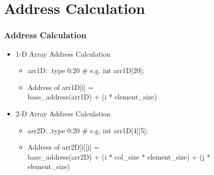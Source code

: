\documentclass[
	10pt, %
	hmargin=1cm,vmargin=0cm,head=0.5cm,headsep=0pt,foot=0.5cm,margin=2cm
]{beamer}
\begin{document}
\section{Address Calculation}
\begin{frame}
	\frametitle{Address Calculation}
	\begin{itemize}
		\item 1-D Array Address Calculation
		\begin{itemize}
			\item arr1D: .type 0:20 \# e.g. int arr1D[20]; \pause
			\item Address of arr1D[i] =  \\ \pause
			\hspace{2cm} base\_address(arr1D) + (i * element\_size) \pause
		\end{itemize}
		\item 2-D Array Address Calculation
		\begin{itemize}
			\item arr2D: .type 0:20 \# e.g. int arr1D[4][5]; \pause
			\item Address of arr2D[i][j] = \\ \pause
			\hspace{0.2cm} base\_address(arr2D) + (i * col\_size * element\_size) + (j * element\_size)
		\end{itemize}
	\end{itemize}
\end{frame}
\end{document}
